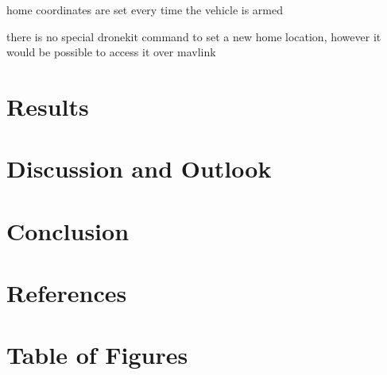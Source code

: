 \documentclass{article}
\begin{document}
	home coordinates are set every time the vehicle is armed
	
	there is no special dronekit command to set a new home location, however it would be possible to access it over mavlink
	
	\section{Results}
	\section{Discussion and Outlook}
	\section{Conclusion}
	
	\section{References}
	\printbibliography[
	heading=bibintoc,
	title={Bibliography}
	]	
	\section{Table of Figures}
\end{document}
